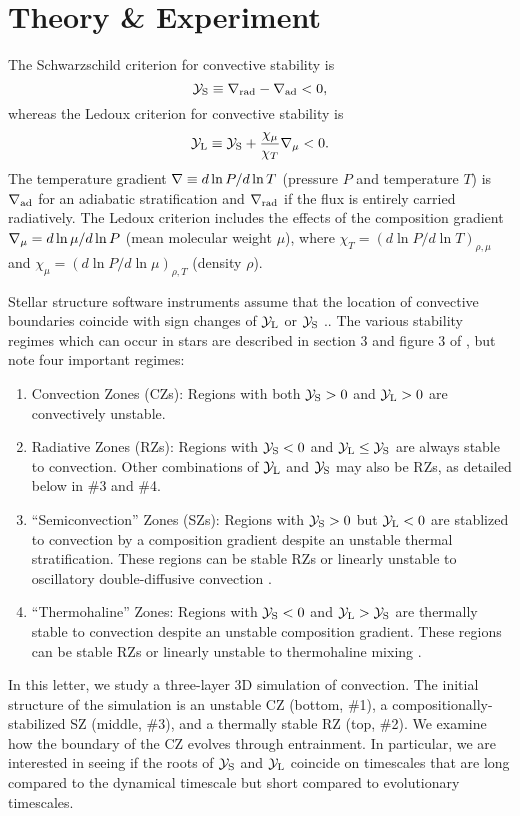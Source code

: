 \section{Theory \& Experiment}
\label{sec:theory}
The Schwarzschild criterion for convective stability is
\begin{equation}
    \yS \equiv \gradrad - \gradad < 0,
    \label{eqn:yS}
\end{equation}
whereas the Ledoux criterion for convective stability is
\begin{equation}
    \yL \equiv \yS +  \frac{\chi_\mu}{\chi_T}\gradmu < 0.
    \label{eqn:yL}
\end{equation}
The temperature gradient $\nabla \equiv d \ln P / d \ln T$ (pressure $P$ and temperature $T$) is $\nabla_{\rm{ad}}$ for an adiabatic stratification and $\nabla_{\rm{rad}}$ if the flux is entirely carried radiatively.
The Ledoux criterion includes the effects of the composition gradient $\nabla_{\mu} = d\ln\mu/d\ln P$ (mean molecular weight $\mu$), where $\chi_T = (d\ln P / d\ln T)_{\rho,\mu}$ and $\chi_\mu = (d\ln P / d\ln\mu)_{\rho,T}$ (density $\rho$).

Stellar structure software instruments assume that the location of convective boundaries coincide with sign changes of $\mathcal{Y}_{\rm{L}}$ or $\mathcal{Y}_{\rm{S}}$ \citep[][sec.~2]{mesa4}..
The various stability regimes which can occur in stars are described in section 3 and figure 3 of \citet{salaris_cassisi_2017}, but note four important regimes:
\begin{enumerate}
    \item Convection Zones (CZs): Regions with both $\mathcal{Y}_{\rm{S}} > 0$ and $\mathcal{Y}_{\rm{L}} > 0$ are convectively unstable.
    \item Radiative Zones (RZs): Regions with $\mathcal{Y}_{\rm{S}} < 0$ and $\mathcal{Y}_{\rm{L}} \leq \mathcal{Y}_{\rm{S}}$ are always stable to convection.
        Other combinations of $\mathcal{Y}_{\rm{L}}$ and $\mathcal{Y}_{\rm{S}}$ may also be RZs, as detailed below in \#3 and \#4.
    \item ``Semiconvection'' Zones (SZs): Regions with $\mathcal{Y}_{\rm{S}} > 0$ but $\mathcal{Y}_{\rm{L}} < 0$ are stablized to convection by a composition gradient despite an unstable thermal stratification.
        These regions can be stable RZs or linearly unstable to oscillatory double-diffusive convection \citep[ODDC, see][chapters 2 and 4]{garaud_2018}.
    \item ``Thermohaline'' Zones: Regions with $\mathcal{Y}_{\rm{S}} < 0$ and $\mathcal{Y}_{\rm{L}} > \mathcal{Y}_{\rm{S}}$ are thermally stable to convection despite an unstable composition gradient.
        These regions can be stable RZs or linearly unstable to thermohaline mixing \citep[see][chapters 2 and 3]{garaud_2018}.
\end{enumerate}
In this letter, we study a three-layer 3D simulation of convection.
The initial structure of the simulation is an unstable CZ (bottom, \#1), a compositionally-stabilized SZ (middle, \#3), and a thermally stable RZ (top, \#2).
We examine how the boundary of the CZ evolves through entrainment.
In particular, we are interested in seeing if the roots of $\mathcal{Y}_{\rm{S}}$ and $\mathcal{Y}_{\rm{L}}$ coincide on timescales that are long compared to the dynamical timescale but short compared to evolutionary timescales.

